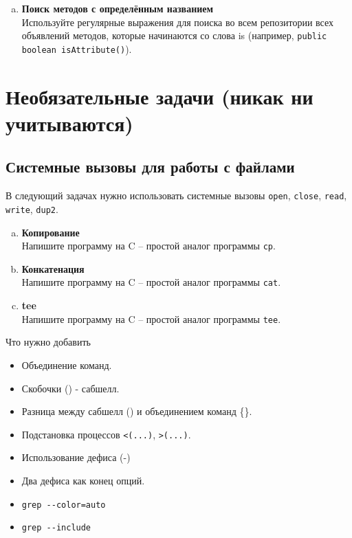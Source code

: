 \documentclass{article}
\begin{document}
\begin{enumerate}[a.]
 
\item \textbf{Поиск методов с определённым названием}\\
Используйте регулярные выражения для поиска во всем репозитории всех объявлений методов, которые начинаются со слова is (например, \texttt{public boolean isAttribute()}).




\end{enumerate}


\newpage
\section{Необязательные задачи (никак ни учитываются)}
\subsection{Системные вызовы для работы с файлами}
В следующий задачах нужно использовать системные вызовы \texttt{open}, \texttt{close}, \texttt{read}, \texttt{write}, \texttt{dup2}.
\begin{enumerate}[a.]
\item \textbf{Копирование}\\
Напишите программу на C -- простой аналог программы \texttt{cp}.
\item \textbf{Конкатенация}\\
Напишите программу на C -- простой аналог программы \texttt{cat}.
\item \textbf{tee}\\
Напишите программу на C -- простой аналог программы \texttt{tee}.
\end{enumerate}


\newpage
Что нужно добавить
\begin{itemize}
\item  Объединение команд.
\item  Скобочки () - сабшелл.
\item Разница между сабшелл () и объединением команд \{\}.
\item  Подстановка процессов \texttt{<(...)}, \texttt{>(...)}.
\item  Использование дефиса (-)
\item  Два дефиса как конец опций.
\item \texttt{grep -{}-color=auto}
\item \texttt{grep -{}-include}
\end{itemize}
\end{document}
